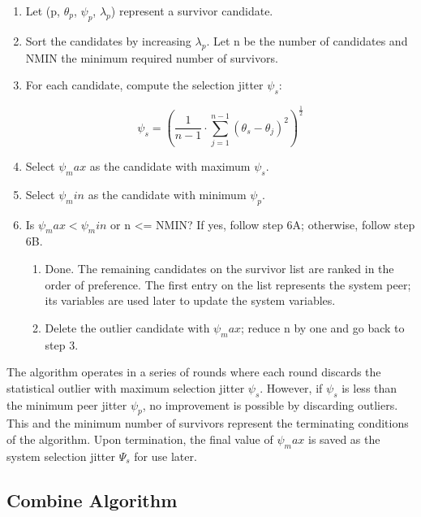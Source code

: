 \begin{enumerate}
  \item Let (p, $ \theta_p $, $ \psi_p $, $ \lambda_p $) represent a survivor candidate.

  \item Sort the candidates by increasing $ \lambda_p $.  Let n be the number
    of candidates and NMIN the minimum required number of survivors.

  \item For each candidate, compute the selection jitter $ \psi_s $:

    $$
    \psi_s = \left( \frac{1}{n - 1} \cdot \sum^{n - 1}_{j = 1} (\theta_s - \theta_j)^2 \right)^{\frac{1}{2}}
    $$

  \item Select $ \psi_max $ as the candidate with maximum $ \psi_s $.
  \item Select $ \psi_min $ as the candidate with minimum $ \psi_p $.

  \item Is $ \psi_max < \psi_min $ or n <= NMIN?  If yes, follow step 6A;
    otherwise, follow step 6B.

    \begin{enumerate}[6A.]
      \item Done. The remaining candidates on the survivor list are ranked
      in the order of preference.  The first entry on the list represents
      the system peer; its variables are used later to update the system
      variables.

      \item Delete the outlier candidate with $ \psi_max $; reduce n by one and go
      back to step 3.
    \end{enumerate}
\end{enumerate}

The algorithm operates in a series of rounds where each round
discards the statistical outlier with maximum selection jitter $ \psi_s $.
However, if $ \psi_s $ is less than the minimum peer jitter $ \psi_p $, no
improvement is possible by discarding outliers.  This and the minimum
number of survivors represent the terminating conditions of the
algorithm.  Upon termination, the final value of $ \psi_max $ is saved as
the system selection jitter $ \Psi_s $ for use later.

\subsection{Combine Algorithm}
\label{section-11-2-3}

